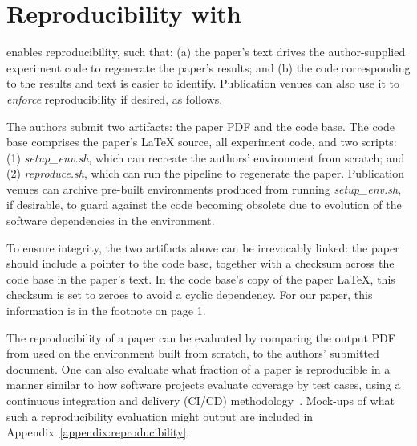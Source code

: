 \section{Reproducibility with \sysname}
\label{sec:pipeline}

\sysname enables reproducibility, such that: (a) the paper's text drives the author-supplied experiment code to regenerate the paper's results; and (b) the code corresponding to the results and text is easier to identify. Publication venues can also use it to \emph{enforce} reproducibility if desired, as follows.

The authors submit two artifacts: the paper PDF and the code base. The code base comprises the paper's \LaTeX{} source, all experiment code, and two scripts: (1) \textit{setup\_env.sh}, which can recreate the authors' environment from scratch; and (2) \textit{reproduce.sh}, which can run the \sysname pipeline to regenerate the paper. Publication venues can archive pre-built environments produced from running \textit{setup\_env.sh}, if desirable, to guard against the code becoming obsolete due to evolution of the software dependencies in the environment.

To ensure integrity, the two artifacts above can be irrevocably linked: the paper should include a pointer to the code base, together with a checksum across the code base in the paper's text. In the code base's copy of the paper \LaTeX{}, this checksum is set to zeroes to avoid a cyclic dependency. For our paper, this information is in the footnote on page 1.

The reproducibility of a paper can be evaluated by comparing the output PDF from \sysname used on the environment built from scratch, to the authors' submitted document.  One can also evaluate what fraction of a paper is reproducible in a manner similar to how software projects evaluate coverage by test cases, using a continuous integration and delivery (CI/CD) methodology~\cite{redhat-ci-cd}. Mock-ups of what such a reproducibility evaluation might output are included in Appendix~\ref{appendix:reproducibility}.
